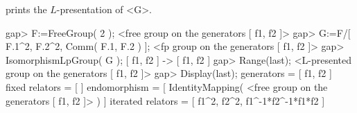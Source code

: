 prints the $L$-presentation of <G>.

\beginexample
gap> F:=FreeGroup( 2 );
<free group on the generators [ f1, f2 ]>
gap> G:=F/[ F.1^2, F.2^2, Comm( F.1, F.2 ) ];
<fp group on the generators [ f1, f2 ]>
gap> IsomorphismLpGroup( G );
[ f1, f2 ] -> [ f1, f2 ]
gap> Range(last);
<L-presented group on the generators [ f1, f2 ]>
gap> Display(last);
generators = [ f1, f2 ]
fixed relators = [ ]
endomorphism = [
IdentityMapping( <free group on the generators [ f1, f2 ]> ) ]
iterated relators = [
f1^2,
f2^2,
f1^-1*f2^-1*f1*f2 ]
\endexample


